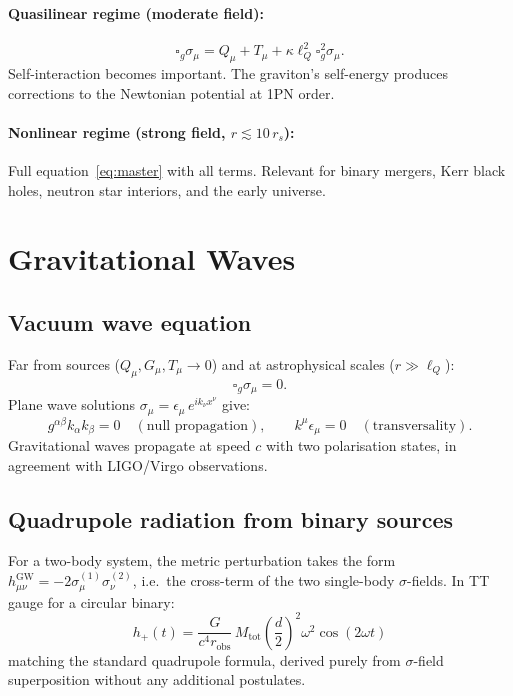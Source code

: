 \documentclass[11pt,a4paper]{article}
\theoremstyle{plain}
\theoremstyle{definition}
\theoremstyle{remark}
\newcommand{\rs}{r_s}
\newcommand{\lQ}{\ell_Q}
\newcommand{\boxg}{\square_g}
\begin{document}
\paragraph{Quasilinear regime (moderate field):}
\[
  \boxg\sigma_\mu = Q_\mu + T_\mu + \kappa\lQ^2\boxg^2\sigma_\mu.
\]
Self-interaction becomes important.  The graviton's self-energy produces corrections
to the Newtonian potential at 1PN order.

\paragraph{Nonlinear regime (strong field, $r \lesssim 10\,\rs$):}
Full equation~\eqref{eq:master} with all terms.  Relevant for binary mergers,
Kerr black holes, neutron star interiors, and the early universe.

\section{Gravitational Waves}
\label{sec:gw}

\subsection{Vacuum wave equation}

Far from sources ($Q_\mu,G_\mu,T_\mu \to 0$) and at astrophysical scales ($r\gg\lQ$):
\begin{equation}
  \boxg\sigma_\mu = 0.
  \label{eq:vac_wave}
\end{equation}
Plane wave solutions $\sigma_\mu = \epsilon_\mu\,e^{ik_\nu x^\nu}$ give:
\begin{equation}
  g^{\alpha\beta}k_\alpha k_\beta = 0\quad(\text{null propagation}),
  \qquad k^\mu\epsilon_\mu = 0\quad(\text{transversality}).
\end{equation}
Gravitational waves propagate at speed $c$ with two polarisation states, in agreement
with LIGO/Virgo observations.

\subsection{Quadrupole radiation from binary sources}

For a two-body system, the metric perturbation takes the form
$h_{\mu\nu}^{\mathrm{GW}} = -2\sigma_\mu^{(1)}\sigma_\nu^{(2)}$, i.e.\ the
cross-term of the two single-body $\sigma$-fields.  In TT gauge for a circular binary:
\begin{equation}
  \boxed{h_+(t) = \frac{G}{c^4 r_{\mathrm{obs}}}\,M_{\mathrm{tot}}
    \!\left(\frac{d}{2}\right)^{\!2}\omega^2\cos(2\omega t)}
  \label{eq:quadrupole}
\end{equation}
matching the standard quadrupole formula, derived purely from $\sigma$-field
superposition without any additional postulates.
\end{document}
